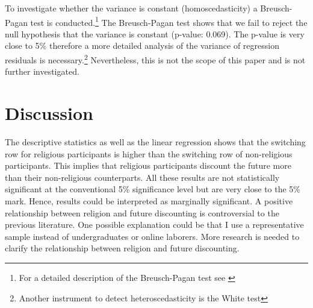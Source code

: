 \documentclass[10pt,a4paper]{article}
\begin{document}

To investigate whether the variance is constant (homoscedasticity) a Breusch-Pagan test is conducted.\footnote{For a detailed description of the Breusch-Pagan test see \textcite{wooldridge2015introductory}} The Breusch-Pagan test shows that we fail to reject the null hypothesis that the variance is constant (p-value: 0.069). The p-value is very close to 5\% therefore a more detailed analysis of the variance of regression residuals is necessary.\footnote{Another instrument to detect heteroscedasticity is the White test} Nevertheless, this is not the scope of this paper and is not further investigated.\\

\section{Discussion}
The descriptive statistics as well as the linear regression shows that the switching row for religious participants is higher than the switching row of non-religious participants. This implies that religious participants discount the future more than their non-religious counterparts. All these results are not statistically significant at the conventional 5\% significance level but are very close to the 5\% mark. Hence, results could be interpreted as marginally significant. A positive relationship between religion and future discounting is controversial to the previous literature. One possible explanation could be that I use a representative sample instead of undergraduates or online laborers. More research is needed to clarify the relationship between religion and future discounting.\\

\end{document}
